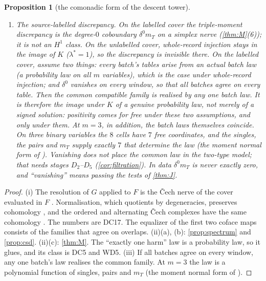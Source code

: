\documentclass[11pt]{article}
\newtheorem{proposition}{Proposition}\newtheorem{corollary}{Corollary}\newtheorem{lemma}{Lemma}
\theoremstyle{definition}\newtheorem{definition}{Definition}\newtheorem{remark}{Remark}
\begin{document}
\begin{proposition}[the comonadic form of the descent tower]
\begin{enumerate}
\begin{enumerate}
    a law can glue and still carry this class (the ``exactly one harm'' law of Step~14).
  \end{enumerate}
\item[(iii)] \emph{The source-labelled discrepancy.} On the labelled cover the triple-moment discrepancy is the degree-$0$ coboundary
  $\delta^0m_T$ on a simplex nerve (\cref{thm:M}(6)); it is not an $H^1$ class. On the unlabelled cover, whole-record injection stays in the
  image of $K$ ($\lambda^*=1$), so the discrepancy is invisible there. On the labelled cover, assume two things: every batch's
  tables arise from an actual batch law (a probability law on all $m$ variables), which is the case under whole-record injection; and
  $\delta^0$ vanishes on every window, so that all batches agree on every table. Then the common compatible family is realised by any
  one batch law. It is therefore the image under $K$ of a genuine probability law, not merely of a signed solution: positivity comes for
  free under these two assumptions, and only under them. At $m=3$, in addition, the batch laws themselves coincide. On three binary
  variables the $8$ cells have $7$ free coordinates, and the singles, the pairs and $m_T$ supply exactly $7$ that determine the law (the
  moment normal form of \cite{PG}). Vanishing does not place the common law in the two-type model; that needs stages $D_2$--$D_5$ (\cref{cor:filtration}). In data
  $\delta^0m_T$ is never exactly zero, and ``vanishing'' means passing the tests of \cref{thm:J}.
\end{enumerate}
\end{proposition}

\begin{proof}
(i) The resolution of $G$ applied to $F$ is the Čech nerve of the cover evaluated in $F$
\cite{Godement1958,JanelidzeTholen1994}. Normalisation, which quotients by degeneracies, preserves cohomology
\cite{Weibel1994}, and the ordered and alternating Čech complexes have the same cohomology \cite{Godement1958}. The numbers are DC17. The
equalizer of the first two coface maps consists of the families that agree on overlaps. (ii)(a), (b): \cref{prop:spectrum} and
\cref{prop:csd}. (ii)(c): \cref{thm:M}. The ``exactly one harm'' law is a probability law, so it glues, and its class is DC5 and WD5.
(iii) If all batches agree on every window, any one batch's law realises the common family. At $m=3$ the law is a polynomial function of
singles, pairs and $m_T$ (the moment normal form of \cite{PG}).
\end{proof}
\end{document}

